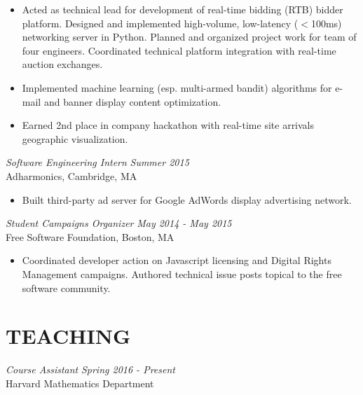 \documentclass{res}
\begin{document}
\begin{resume}
\begin{itemize}
        \item Acted as technical lead for development of real-time bidding
            (RTB) bidder platform. Designed and implemented high-volume,
            low-latency ($<$100ms) networking server in Python.  Planned and
            organized project work for team of four engineers.  Coordinated
            technical platform integration with real-time auction exchanges.

        \item Implemented machine learning (esp. multi-armed bandit) algorithms
            for e-mail and banner display content optimization. 

         \item Earned 2nd place in company hackathon with real-time site
            arrivals geographic visualization.

    \end{itemize}
                 
    {\sl Software Engineering Intern} \hfill {\sl Summer 2015} \\
    Adharmonics, Cambridge, MA

    \begin{itemize} \itemsep -2.5pt

        \item Built third-party ad server for Google AdWords display
            advertising network. 

    \end{itemize} 

    {\sl Student Campaigns Organizer} \hfill {\sl May 2014 - May 2015} \\
    Free Software Foundation, Boston, MA

    \begin{itemize}   \itemsep -2.5pt 
        \item Coordinated developer action on Javascript licensing and Digital
            Rights Management campaigns. Authored technical issue posts topical
            to the free software community.

    \end{itemize} 

\section{TEACHING}
    {\sl Course Assistant} \hfill {\sl Spring 2016 - Present} \\
    Harvard Mathematics Department


\end{resume}
\end{document}
